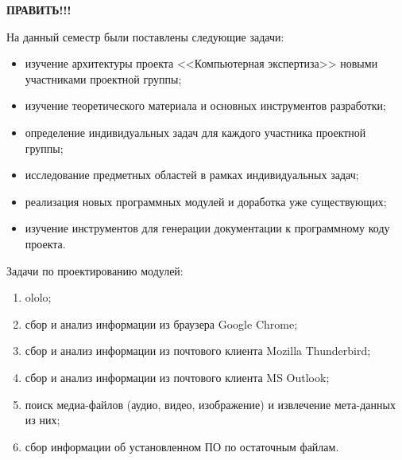 \textbf{ПРАВИТЬ!!!}

На данный семестр были поставлены следующие задачи:

\begin{itemize}
\item изучение архитектуры проекта <<Компьютерная экспертиза>> новыми участниками проектной группы;
\item изучение теоретического материала и основных инструментов разработки;
\item определение индивидуальных задач для каждого участника проектной группы;
\item исследование предметных областей в рамках индивидуальных задач; 
\item реализация новых программных модулей и доработка уже существующих;
\item изучение инструментов для генерации документации к программному коду проекта.
\end{itemize}

Задачи по проектированию модулей:

\begin{enumerate}
\item ololo;

\item сбор и анализ информации из браузера Google Chrome;
\item сбор и анализ информации из почтового клиента Mozilla Thunderbird;
\item сбор и анализ информации из почтового клиента MS Outlook;
\item поиск медиа-файлов (аудио, видео, изображение) и извлечение мета-данных из них;
\item сбор информации об установленном ПО по остаточным файлам.
\end{enumerate}

